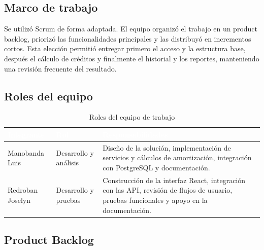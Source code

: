 \documentclass[12pt,a4paper]{article}
\begin{document}
\subsection{Marco de trabajo}

Se utilizó Scrum de forma adaptada. El equipo organizó el trabajo en un
product backlog, priorizó las funcionalidades principales y las distribuyó en
incrementos cortos. Esta elección permitió entregar primero el acceso y la
estructura base, después el cálculo de créditos y finalmente el historial y
los reportes, manteniendo una revisión frecuente del resultado.

\subsection{Roles del equipo}

\begin{table}[H]
\centering
\caption{Roles del equipo de trabajo}
\begin{tabularx}{\textwidth}{>{\raggedright\arraybackslash}p{4cm} >{\raggedright\arraybackslash}p{4cm} X}
\toprule
\rowcolor{azulUTA}
\textcolor{white}{\textbf{Integrante}} & \textcolor{white}{\textbf{Rol}} & \textcolor{white}{\textbf{Responsabilidades}} \\
\midrule
Manobanda Luis & Desarrollo y análisis & Diseño de la solución, implementación de servicios y cálculos de amortización, integración con PostgreSQL y documentación. \\
Redroban Joselyn & Desarrollo y pruebas & Construcción de la interfaz React, integración con las API, revisión de flujos de usuario, pruebas funcionales y apoyo en la documentación. \\
\bottomrule
\end{tabularx}
\end{table}

\subsection{Product Backlog}
\end{document}
